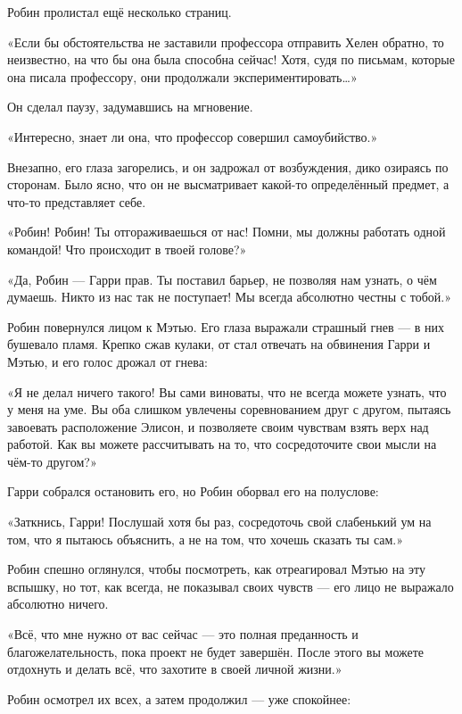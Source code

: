 \documentclass[a4paper,12pt]{book}
\begin{document}
\par
Робин пролистал ещё несколько страниц.
\par
«Если бы обстоятельства не заставили профессора отправить Хелен обратно, то неизвестно, на что бы она была способна сейчас! Хотя, судя по письмам, которые она писала профессору, они продолжали экспериментировать…»
\par
Он сделал паузу, задумавшись на мгновение.
\par
«Интересно, знает ли она, что профессор совершил самоубийство.»
\par
Внезапно, его глаза загорелись, и он задрожал от возбуждения, дико озираясь по сторонам. Было ясно, что он не высматривает какой-то определённый предмет, а что-то представляет себе.
\par
«Робин! Робин! Ты отгораживаешься от нас! Помни, мы должны работать одной командой! Что происходит в твоей голове?»
\par
«Да, Робин — Гарри прав. Ты поставил барьер, не позволяя нам узнать, о чём думаешь. Никто из нас так не поступает! Мы всегда абсолютно честны с тобой.»
\par
Робин повернулся лицом к Мэтью. Его глаза выражали страшный гнев — в них бушевало пламя. Крепко сжав кулаки, от стал отвечать на обвинения Гарри и Мэтью, и его голос дрожал от гнева:
\par
«Я не делал ничего такого! Вы сами виноваты, что не всегда можете узнать, что у меня на уме. Вы оба слишком увлечены соревнованием друг с другом, пытаясь завоевать расположение Элисон, и позволяете своим чувствам взять верх над работой. Как вы можете рассчитывать на то, что сосредоточите свои мысли на чём-то другом?»
\par
Гарри собрался остановить его, но Робин оборвал его на полуслове:
\par
«Заткнись, Гарри! Послушай хотя бы раз, сосредоточь свой слабенький ум на том, что я пытаюсь объяснить, а не на том, что хочешь сказать ты сам.»
\par
Робин спешно оглянулся, чтобы посмотреть, как отреагировал Мэтью на эту вспышку, но тот, как всегда, не показывал своих чувств — его лицо не выражало абсолютно ничего.
\par
«Всё, что мне нужно от вас сейчас — это полная преданность и благожелательность, пока проект не будет завершён. После этого вы можете отдохнуть и делать всё, что захотите в своей личной жизни.»
\par
Робин осмотрел их всех, а затем продолжил — уже спокойнее:
\par
\end{document}
